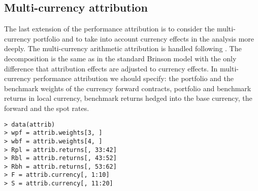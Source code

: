 \documentclass[11pt,a4paper]{article}
\begin{document}
\subsection{Multi-currency attribution}
The last extension of the performance attribution is to consider the multi-currency portfolio and to take into account currency effects in the analysis more deeply. The multi-currency arithmetic attribution is handled following \cite{ankrim1994multicurrency}. The decomposition is the same as in the standard Brinson model with the only difference that attribution effects are adjusted to currency effects. In multi-currency performance attribution we should specify: the portfolio and the benchmark weights of the currency forward contracts, portfolio and benchmark returns in local currency, benchmark returns hedged into the base currency, the forward and the spot rates.
\begingroup
\fontsize{9pt}{12pt}\selectfont
\begin{verbatim}
> data(attrib)
> wpf = attrib.weights[3, ]
> wbf = attrib.weights[4, ]
> Rpl = attrib.returns[, 33:42]
> Rbl = attrib.returns[, 43:52]
> Rbh = attrib.returns[, 53:62]
> F = attrib.currency[, 1:10]
> S = attrib.currency[, 11:20]
\end{verbatim}
\endgroup
\end{document}
